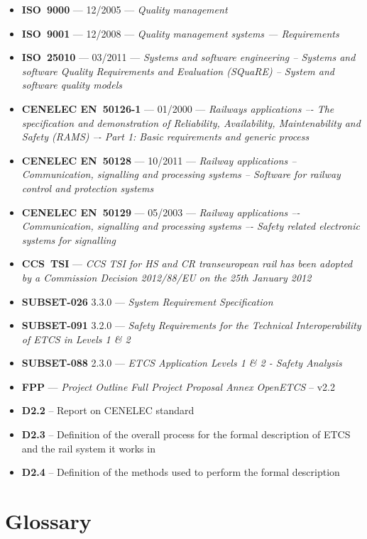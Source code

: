 \documentclass{template/openetcs_report}
\begin{document}
\begin{itemize}
\item \textbf{ISO~9000} --- 12/2005 --- \emph{Quality management}
\item \textbf{ISO~9001} --- 12/2008 --- \emph{Quality management systems — Requirements}
\item \textbf{ISO~25010} --- 03/2011 --- \emph{Systems and software engineering -- Systems and software Quality Requirements and Evaluation (SQuaRE) -- System and software quality models}
\item \textbf{CENELEC EN~50126-1} --- 01/2000 --- \emph{Railways applications –- The specification and 
demonstration of Reliability, Availability, Maintenability and Safety (RAMS) –- Part 1: 
Basic requirements and generic process}
\item \textbf{CENELEC EN~50128} --- 10/2011 --- \emph{Railway applications -- Communication, signalling and 
processing systems -- Software for railway control and protection systems}
\item \textbf{CENELEC EN~50129} --- 05/2003 --- \emph{Railway applications –- Communication, signalling and 
processing systems –- Safety related electronic systems for signalling}
\item \textbf{CCS~TSI} --- \emph{ CCS TSI for HS and CR transeuropean rail has been adopted by a Commission Decision 2012/88/EU on the 25th January 2012}
\item \textbf{SUBSET-026} 3.3.0 --- \emph{System Requirement Specification}
\item \textbf{SUBSET-091} 3.2.0 --- \emph{Safety Requirements for the Technical Interoperability
of ETCS in Levels 1 \& 2}
\item \textbf{SUBSET-088} 2.3.0 --- \emph{ETCS Application Levels 1 \& 2 - Safety Analysis}
\item \textbf{FPP} --- \emph{Project Outline Full Project Proposal Annex OpenETCS} -- v2.2
\item \textbf{D2.2} -- Report on CENELEC standard
\item \textbf{D2.3} -- Definition of the overall process for the formal description of ETCS and the rail system it works in 
\item \textbf{D2.4} -- Definition of the methods used to perform the formal description
\end{itemize}



\section{Glossary}
\label{sec:glossary}
\end{document}
